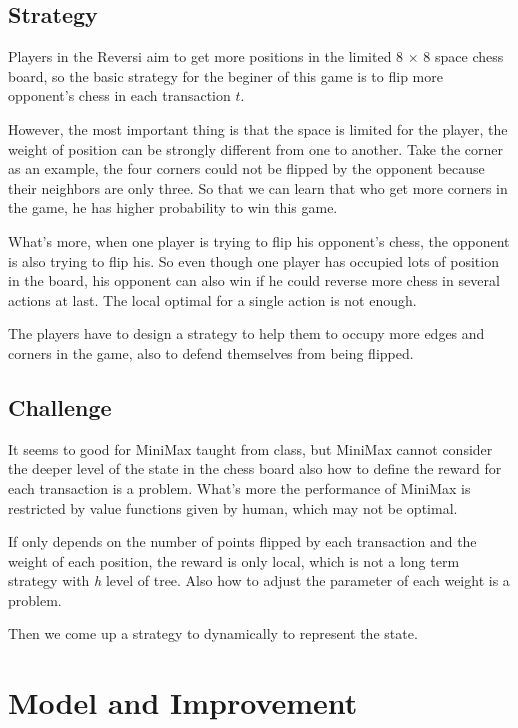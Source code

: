 \documentclass[10pt,twocolumn,letterpaper]{article}
\begin{document}
\subsection{Strategy}

Players in the Reversi aim to get more positions in 
the limited 8 $\times$ 8 space chess board, so the 
basic strategy for the beginer of this game is to 
flip more opponent's chess in each transaction $t$.

However, the most important thing is that the space 
is limited for the player, the weight of position can 
be strongly different from one to another. Take the 
corner as an example, the four corners could not be 
flipped by the opponent because their neighbors are 
only three. So that we can learn that who get more 
corners in the game, he has higher probability to 
win this game.

What's more, when one player is trying to flip his 
opponent's chess, the opponent is also trying to flip 
his. So even though one player has occupied lots 
of position in the board, his opponent can also 
win if he could reverse more chess in several actions 
at last. The local optimal for a single action is not 
enough.

The players have to design a strategy to help them 
to occupy more edges and corners in the game, also to 
defend themselves from being flipped.


\subsection{Challenge}

It seems to good for MiniMax taught from class, but 
MiniMax cannot consider the deeper level of the state 
in the chess board also how to define the reward for each 
transaction is a problem. What's more the performance of 
MiniMax is restricted by value functions given by human, 
which may not be optimal.

If only depends on the number of points flipped 
by each transaction and the weight of each position, 
the reward is only local, which is not a long term 
strategy with \emph{h} level of tree. 
Also how to adjust the parameter of each weight is 
a problem.

Then we come up a strategy to dynamically to represent 
the state.


\section{Model and Improvement}
\end{document}
